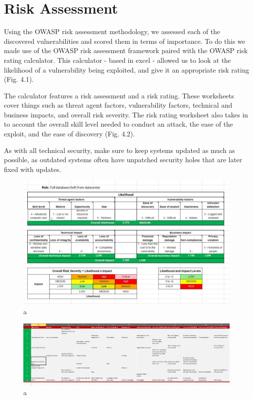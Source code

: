 \documentclass{report}
\begin{document}
\section{Risk Assessment}

Using the OWASP risk assessment methodology, we assessed each of the discovered vulnerabilities and scored them in terms of importance. To do this we made use of the OWASP risk assessment framework paired with the OWASP risk rating calculator. This calculator - based in excel - allowed us to look at the likelihood of a vulnerability being exploited, and give it an appropriate risk rating (Fig. 4.1).

The calculator features a risk assessment and a risk rating. These worksheets cover things such as threat agent factors, vulnerability factors, technical and business impacts, and overall risk severity. The risk rating worksheet also takes in to account the overall skill level needed to conduct an attack, the ease of the exploit, and the ease of discovery (Fig. 4.2).

As with all technical security, make sure to keep systems updated as much as possible, as outdated systems often have unpatched security holes that are later fixed with updates.
\begin{figure}[!htb]
	\centering
	\includegraphics[scale=0.4]{img/riskcalc.JPG}
	\caption{a}
\end{figure}
\begin{figure}[!htb]
	\centering
	\includegraphics[scale=0.3]{img/riskrating.JPG}
	\caption{a}
\end{figure}
\pagebreak
\end{document}
